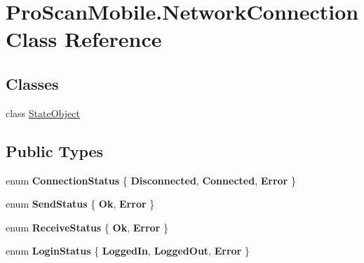 \hypertarget{class_pro_scan_mobile_1_1_network_connection}{\section{Pro\-Scan\-Mobile.\-Network\-Connection Class Reference}
\label{class_pro_scan_mobile_1_1_network_connection}
}
\subsection*{Classes}
\begin{DoxyCompactItemize}
\item 
class \hyperlink{class_pro_scan_mobile_1_1_network_connection_1_1_state_object}{State\-Object}
\end{DoxyCompactItemize}
\subsection*{Public Types}
\begin{DoxyCompactItemize}
\item 
enum {\bfseries Connection\-Status} \{ {\bfseries Disconnected}, 
{\bfseries Connected}, 
{\bfseries Error}
 \}
\item 
enum {\bfseries Send\-Status} \{ {\bfseries Ok}, 
{\bfseries Error}
 \}
\item 
enum {\bfseries Receive\-Status} \{ {\bfseries Ok}, 
{\bfseries Error}
 \}
\item 
enum {\bfseries Login\-Status} \{ {\bfseries Logged\-In}, 
{\bfseries Logged\-Out}, 
{\bfseries Error}
 \}
\end{DoxyCompactItemize}
